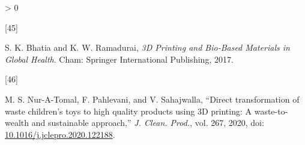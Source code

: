 \documentclass[conference,final,]{IEEEtran}
\newlength{\csllabelwidth}
\newlength{\cslhangindent}
\newenvironment{CSLReferences}[3] %
 {%
  \setlength{\parindent}{0pt}
  \ifodd #1 \everypar{\setlength{\hangindent}{\cslhangindent}}\ignorespaces\fi
  \ifnum #2 > 0
  \setlength{\parskip}{#2\baselineskip}
  \fi
 }%
 {}
\newcommand{\CSLLeftMargin}[1]{\parbox[t]{\csllabelwidth}{#1}}
\newcommand{\CSLRightInline}[1]{\parbox[t]{\linewidth - \csllabelwidth}{#1}}
\begin{document}
\begin{CSLReferences}{0}{0}
\leavevmode\hypertarget{ref-Bhatia2017}{}%
\CSLLeftMargin{{[}45{]} }
\CSLRightInline{S. K. Bhatia and K. W. Ramadurai, \emph{{3D Printing and
Bio-Based Materials in Global Health}}. Cham: Springer International
Publishing, 2017.}

\leavevmode\hypertarget{ref-Nur-A-Tomal2020}{}%
\CSLLeftMargin{{[}46{]} }
\CSLRightInline{M. S. Nur-A-Tomal, F. Pahlevani, and V. Sahajwalla,
{``{Direct transformation of waste children's toys to high quality
products using 3D printing: A waste-to-wealth and sustainable
approach},''} \emph{J. Clean. Prod.}, vol. 267, 2020, doi:
\href{https://doi.org/10.1016/j.jclepro.2020.122188}{10.1016/j.jclepro.2020.122188}.}

\end{CSLReferences}
\end{document}
